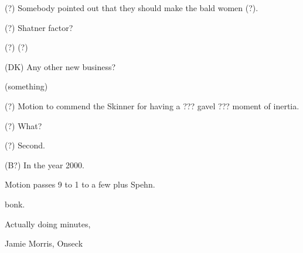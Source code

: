 (?) Somebody pointed out that they should make the bald women (?).

(?) Shatner factor?

(?) (?)

(DK) Any other new business?

(something)

(?) Motion to commend the Skinner for having a ??? gavel ??? moment
of inertia.

(?) What?

(?) Second.

(B?) In the year 2000.

Motion passes 9 to 1 to a few plus Spehn.

bonk.

\vspace{0.15in}
\begin{center}
Actually doing minutes,

Jamie Morris, Onseck
\end{center}

